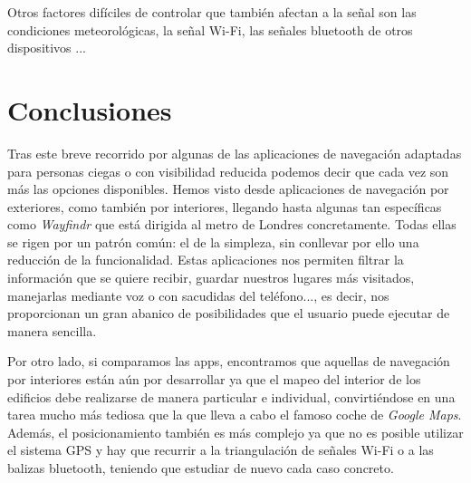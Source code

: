 Otros factores difíciles de controlar que también afectan a la señal son las condiciones meteorológicas, la señal Wi-Fi, las señales bluetooth de otros dispositivos \citep{beaconsinterferences}...


\section{Conclusiones}
\label{sec:conclusionesposicionamiento}

Tras este breve recorrido por algunas de las aplicaciones de navegación adaptadas para personas ciegas o con visibilidad reducida podemos decir que cada vez son más las opciones disponibles. Hemos visto desde aplicaciones de navegación por exteriores, como también por interiores, llegando hasta algunas tan específicas como \textit{Wayfindr} que está dirigida al metro de Londres concretamente. Todas ellas se rigen por un patrón común: el de la simpleza, sin conllevar por ello una reducción de la funcionalidad. Estas aplicaciones nos permiten filtrar la información que se quiere recibir, guardar nuestros lugares más visitados, manejarlas mediante voz o con sacudidas del teléfono..., es decir, nos proporcionan un gran abanico de posibilidades que el usuario puede ejecutar de manera sencilla.

Por otro lado, si comparamos las apps, encontramos que aquellas de navegación por interiores están aún por desarrollar ya que el mapeo del interior de los edificios debe realizarse de manera particular e individual, convirtiéndose en una tarea mucho más tediosa que la que lleva a cabo el famoso coche de \textit{Google Maps}. Además, el posicionamiento también es más complejo ya que no es posible utilizar el sistema GPS y hay que recurrir a la triangulación de señales Wi-Fi o a las balizas bluetooth, teniendo que estudiar de nuevo cada caso concreto.

